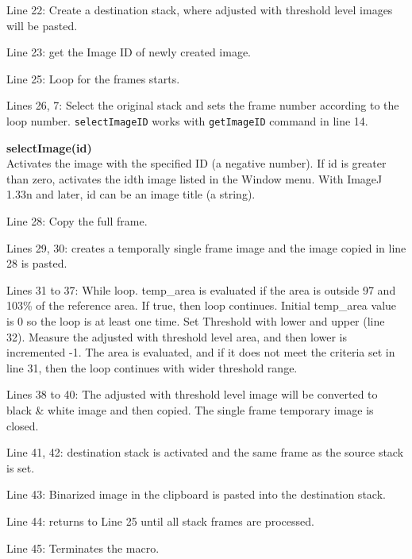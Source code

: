 \documentclass[11pt,a4paper,oneside]{report}
\newenvironment{indentCom}%
{\begin{list}{}%
         {\setlength{\leftmargin}{1em}}%
         \item[]%
}
{\end{list}}
\newcommand{\ilcom}[1]{\texttt{\small#1}}
\begin{document}
\begin{itemize}
\item Line 22: Create a destination stack, where adjusted with threshold level images will be pasted. 

\item Line 23: get the Image ID of newly created image. 

\item Line 25: Loop for the frames starts. 

\item Lines 26, 7: Select the original stack and sets the frame number according to the loop number. \ilcom{selectImageID} works with \ilcom{getImageID} command in line 14. 


\begin{indentCom}
\textbf{selectImage(id)}\\
Activates the image with the specified ID (a negative number). If id is greater than zero, activates the idth image listed in the Window menu. With ImageJ 1.33n and later, id can be an image title (a string).
\end{indentCom}

\item Line 28: Copy the full frame.

\item Lines 29, 30: creates a temporally single frame image and the image copied in line 28 is pasted. 

\item Lines 31 to 37: While loop. temp\_area is evaluated if the area is outside 97 and 103\% of the reference area. If true, then loop continues. Initial temp\_area value is 0 so the loop is at least one time. Set Threshold with lower and upper (line 32). Measure the adjusted with threshold level area, and then lower is incremented -1. The area is evaluated, and if it does not meet the criteria set in line 31, then the loop continues with wider threshold range. 

\item Lines 38 to 40: The adjusted with threshold level image will be converted to black \& white image and then copied. The single frame temporary image is closed.

\item Line 41, 42: destination stack is activated and the same frame as the source stack is set. 

\item Line 43: Binarized image in the clipboard is pasted into the destination stack.

\item Line 44: returns to Line 25 until all stack frames are processed.

\item Line 45: Terminates the macro. 
\end{itemize}
\end{document}

